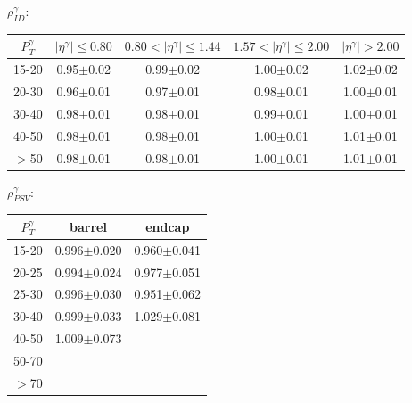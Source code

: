 \begin{frame}
{\begin{center}$\rho^{\gamma}_{ID}$: \end{center}}
\begin{table}[h]
  \tiny
  \begin{center}
   \begin{tabular}{|c|c|c|c|c|}
\hline
 $P_T^{\gamma}$  & $|\eta^{\gamma}|\leq 0.80$ & $0.80<|\eta^{\gamma}|\leq 1.44$ & $1.57<|\eta^{\gamma}|\leq 2.00$ & $|\eta^{\gamma}|> 2.00$\\ \hline
15-20          & 0.95$\pm$0.02   & 0.99$\pm$0.02        & 1.00$\pm$0.02        & 1.02$\pm$0.02 \\ \hline
20-30          & 0.96$\pm$0.01   & 0.97$\pm$0.01        & 0.98$\pm$0.01        & 1.00$\pm$0.01 \\ \hline
30-40          & 0.98$\pm$0.01   & 0.98$\pm$0.01        & 0.99$\pm$0.01        & 1.00$\pm$0.01 \\ \hline
40-50          & 0.98$\pm$0.01   & 0.98$\pm$0.01        & 1.00$\pm$0.01        & 1.01$\pm$0.01 \\ \hline
$>$50          & 0.98$\pm$0.01   & 0.98$\pm$0.01        & 1.00$\pm$0.01        & 1.01$\pm$0.01 \\ \hline
  \end{tabular}
  \label{tab:SFs_PhotonID}
  \end{center}
\end{table}

{\begin{center}$\rho^{\gamma}_{PSV}$: \end{center}}
\begin{table}[h]
  \tiny
  \begin{center}
   \begin{tabular}{|c|c|c|}
\hline
 $P_T^{\gamma}$  & barrel              & endcap \\ \hline
15-20          & 0.996$\pm$0.020     & 0.960$\pm$0.041 \\ \hline
20-25          & 0.994$\pm$0.024     & 0.977$\pm$0.051 \\ \hline
25-30          & 0.996$\pm$0.030     & 0.951$\pm$0.062 \\ \hline
30-40          & 0.999$\pm$0.033     & 1.029$\pm$0.081 \\ \hline
40-50          & 1.009$\pm$0.073     & {\bfseries\color{blue}{0.971$\pm$0.150}} \\ \hline
50-70          & {\bfseries\color{blue}{0.993$\pm$0.128}}     & {\bfseries\color{blue}{0.965$\pm$0.294}} \\ \hline
$>$70          & {\bfseries\color{blue}{1.047$\pm$0.111}}     & {\bfseries\color{blue}{1.145$\pm$0.371}} \\ \hline

  \end{tabular}
  \label{tab:SFs_PhotonPixelSeedVeto}
  \end{center}
\end{table}


\end{frame}%

